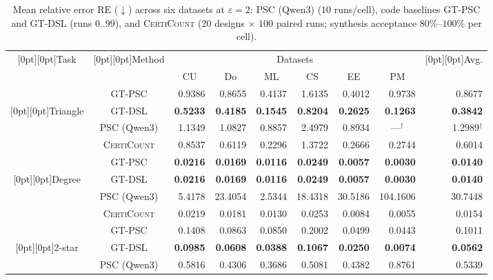 \documentclass[conference]{IEEEtran}
\theoremstyle{ieeeitalic}
\newcommand{\RE}{\mathrm{RE}}
\begin{document}
\begin{table}[t]
\centering
\caption{Mean relative error $\RE$ ($\downarrow$) across six datasets at $\varepsilon=2$: PSC (Qwen3) ($10$ runs/cell), code baselines GT-PSC and GT-DSL (runs $0..99$), and \textsc{CertiCount} ($20$ designs $\times$ $100$ paired runs; synthesis acceptance $80\%$--$100\%$ per cell).}
\label{tab:rq1}
\scriptsize
\renewcommand{\arraystretch}{1.0}
\setlength{\tabcolsep}{8pt}
\begin{tabular}{ccrrrrrrr}
\toprule
\raisebox{-1.2ex}[0pt][0pt]{Task} & \raisebox{-1.2ex}[0pt][0pt]{Method} & \multicolumn{6}{c}{Datasets} & \raisebox{-1.2ex}[0pt][0pt]{Avg.} \\
\cmidrule(lr){3-8}
 & & \multicolumn{1}{c}{CU} & \multicolumn{1}{c}{Do} & \multicolumn{1}{c}{ML} & \multicolumn{1}{c}{CS} & \multicolumn{1}{c}{EE} & \multicolumn{1}{c}{PM} & \\
\midrule
 & GT-PSC & 0.9386 & 0.8655 & 0.4137 & 1.6135 & 0.4012 & 0.9738 & 0.8677 \\
\raisebox{-1.2ex}[0pt][0pt]{Triangle} & GT-DSL & \textbf{0.5233} & \textbf{0.4185} & \textbf{0.1545} & \textbf{0.8204} & \textbf{0.2625} & \textbf{0.1263} & \textbf{0.3842} \\
 & PSC (Qwen3) & 1.1349 & 1.0827 & 0.8857 & 2.4979 & 0.8934 & \multicolumn{1}{c}{---$^\dagger$} & 1.2989$^\dagger$ \\
 & \textsc{CertiCount} & 0.8537 & 0.6119 & 0.2296 & 1.3722 & 0.2666 & 0.2744 & 0.6014 \\
\midrule
 & GT-PSC & \textbf{0.0216} & \textbf{0.0169} & \textbf{0.0116} & \textbf{0.0249} & \textbf{0.0057} & \textbf{0.0030} & \textbf{0.0140} \\
\raisebox{-1.2ex}[0pt][0pt]{Degree} & GT-DSL & \textbf{0.0216} & \textbf{0.0169} & \textbf{0.0116} & \textbf{0.0249} & \textbf{0.0057} & \textbf{0.0030} & \textbf{0.0140} \\
 & PSC (Qwen3) & 5.4178 & 23.4054 & 2.5344 & 18.4318 & 30.5186 & 104.1606 & 30.7448 \\
 & \textsc{CertiCount} & 0.0219 & 0.0181 & 0.0130 & 0.0253 & 0.0084 & 0.0055 & 0.0154 \\
\midrule
 & GT-PSC & 0.1408 & 0.0863 & 0.0850 & 0.2002 & 0.0499 & 0.0443 & 0.1011 \\
\raisebox{-1.2ex}[0pt][0pt]{2-star} & GT-DSL & \textbf{0.0985} & \textbf{0.0608} & \textbf{0.0388} & \textbf{0.1067} & \textbf{0.0250} & \textbf{0.0074} & \textbf{0.0562} \\
 & PSC (Qwen3) & 0.5816 & 0.4306 & 0.3686 & 0.5081 & 0.4382 & 0.8761 & 0.5339 \\

\end{tabular}
\end{table}
\end{document}
